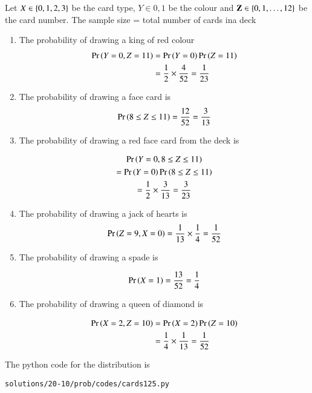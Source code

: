 Let $X \in \left\{0,1,2,3\right\}$ be the card type, $Y \in{0,1}$ be the colour and 
$\mathbf{Z} \in \left\{0,1,\dots,12\right\}$ be the card number.
The sample size = total number of cards ina deck
\begin{enumerate}
\item  
The probability of drawing a king of red colour 
\begin{align}
\Pr\left(Y = 0, Z=11\right) &= \Pr\left(Y = 0\right)\Pr\left( Z=11\right)
\\
&= \frac{1}{2}\times \frac{4}{52} = \frac{1}{23}
\end{align}


\item  
The probability of drawing a face card is 
\begin{align}
\Pr\left(8\le Z \le 11\right) =  \frac{12}{52}= \frac{3}{13}
\end{align}


\item  The probability of drawing a red face card from the deck is 

\begin{multline}
\Pr\left(Y=0,8\le Z \le 11 \right)
\\
=\Pr\left(Y=0\right)\Pr\left(8\le Z \le 11 \right)
\\
=\frac{1}{2}\times \frac{3}{13}= \frac{3}{23}
\end{multline}


\item The probability of drawing a jack of hearts is 
\begin{align}
\Pr\left(Z = 9, X = 0\right) = \frac{1}{13}\times \frac{1}{4}= \frac{1}{52}
\end{align}


\item The probability of drawing a spade is 

\begin{align}
\Pr\left(X = 1\right)= \frac{13}{52}= \frac{1}{4}
\end{align}


\item 	The probability of drawing a queen of diamond is 

\begin{align}
\Pr\left(X = 2, Z = 10\right) &= \Pr\left(X = 2\right)\Pr\left( Z = 10\right) 
\\
&=\frac{1}{4}\times \frac{1}{13} = \frac{1}{52}
\end{align}
\end{enumerate}

The python code for the distribution is
\begin{lstlisting}
solutions/20-10/prob/codes/cards125.py
\end{lstlisting}
